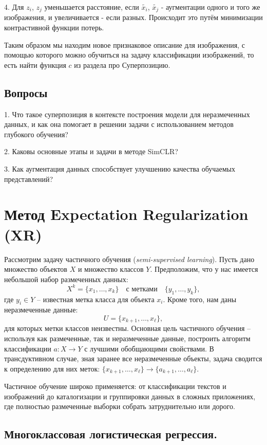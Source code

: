 4. Для $z_i$, $z_j$ уменьшается расстояние, если $\tilde{x_i}$, $\tilde{x_j}$ - аугментации одного и того же изображения, и увеличивается - если разных. Происходит это путём минимизации контрастивной функции потерь. 

Таким образом мы находим новое признаковое описание для изображения, с помощью которого можно обучиться на задачу классификации изображений, то есть найти функция $c$ из раздела про Суперпозицию.

\subsection{Вопросы}
\hspace{2em}1. Что такое суперпозиция в контексте построения модели для неразмеченных данных, и как она помогает в решении задачи с использованием методов глубокого обучения?

2. Каковы основные этапы и задачи в методе SimCLR?

3. Как аугментация данных способствует улучшению качества обучаемых представлений?

\section{Метод Expectation Regularization (XR)}

Рассмотрим задачу частичного обучения (\textit{semi-supervised learning}). Пусть дано множество объектов $X$ и множество классов $Y$. Предположим, что у нас имеется небольшой набор размеченных данных:
\[
X^k = \{ x_1, \ldots, x_k \} \quad \text{с метками} \quad \{y_1, \ldots, y_k\},
\]
где $y_i \in Y$ – известная метка класса для объекта $x_i$. Кроме того, нам даны неразмеченные данные:
\[
U = \{x_{k+1}, \ldots, x_{\ell}\},
\]
для которых метки классов неизвестны. Основная цель частичного обучения – используя как размеченные, так и неразмеченные данные, построить алгоритм классификации $a: X \rightarrow Y$ с лучшими обобщающими свойствами. В трансдуктивном случае, зная заранее все неразмеченные объекты, задача сводится к определению для них меток: $\{x_{k+1}, \ldots, x_{\ell}\} \rightarrow \{a_{k+1}, \ldots, a_{\ell}\}$.

Частичное обучение широко применяется: от классификации текстов и изображений до каталогизации и группировки данных в сложных приложениях, где полностью размеченные выборки собрать затруднительно или дорого.

\subsection{Многоклассовая логистическая регрессия.}

